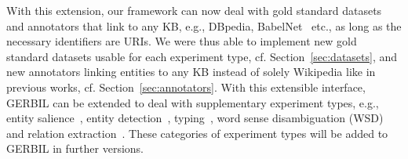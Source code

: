 With this extension, our framework can now deal with gold standard datasets and annotators that link to any \ac{KB}, e.g., DBpedia, BabelNet~\cite{NavigliPonzetto:12aij} etc., as long as the necessary identifiers are URIs.
We were thus able to implement \numberOfadditionalDatasets new gold standard datasets usable for each experiment type, cf. Section~\ref{sec:datasets}, and \numberOfadditionalAnnotators new annotators linking entities to any \ac{KB} instead of solely Wikipedia like in previous works, cf. Section~\ref{sec:annotators}.
With this extensible interface, GERBIL can be extended to deal with supplementary experiment types, e.g., entity salience~\cite{cornolti}, entity detection~\cite{FOX}, typing~\cite{rizzo2014}, word sense disambiguation (WSD)~\cite{babelfy} and relation extraction~\cite{FOX}.
These categories of experiment types will be added to GERBIL in further versions.


